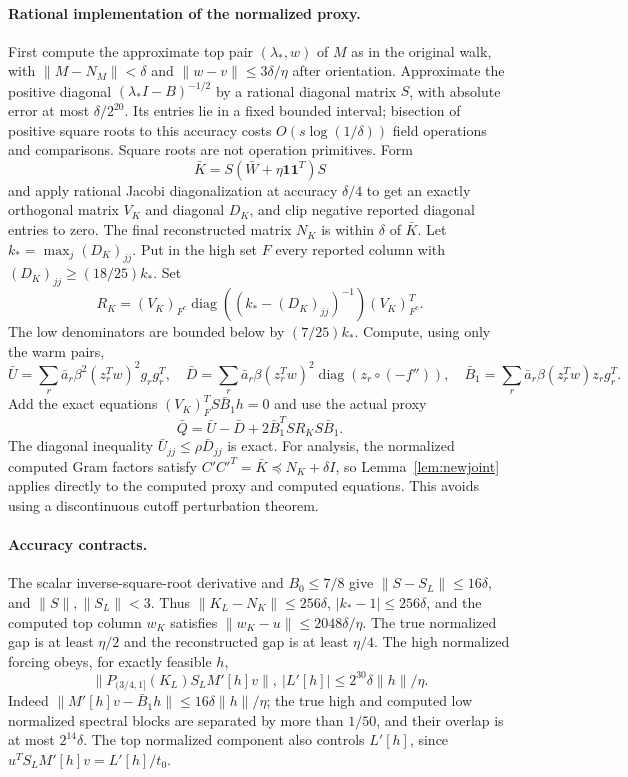 \documentclass[11pt]{amsart}
\theoremstyle{remark}\newtheorem{remark}[theorem]{Remark}
\newcommand{\one}{\mathbf1}
\begin{document}
\paragraph{Rational implementation of the normalized proxy.}
First compute the approximate top pair $(\lambda_*,w)$ of $M$ as in the
original walk, with $\|M-N_M\|<\delta$ and $\|w-v\|\le3\delta/\eta$
after orientation. Approximate the positive diagonal
$(\lambda_*I-B)^{-1/2}$ by a rational diagonal matrix $S$, with absolute
error at most $\delta/2^{20}$. Its entries lie in a fixed bounded interval;
bisection of positive square roots to this accuracy costs
$O(s\log(1/\delta))$ field operations and comparisons. Square roots are
not operation primitives. Form
\[
 \bar K=S(\bar W+\eta\one\one^T)S
\]
and apply rational Jacobi diagonalization at accuracy $\delta/4$ to get an exactly orthogonal
matrix $V_K$ and diagonal $D_K$, and clip negative reported diagonal entries to zero. The final reconstructed
matrix $N_K$ is within $\delta$ of $\bar K$.
Let $k_* =\max_j(D_K)_{jj}$. Put in the high set $F$ every reported column
with $(D_K)_{jj}\ge(18/25)k_*$. Set
\[
 R_K=(V_K)_{F^c}\operatorname{diag}((k_*-(D_K)_{jj})^{-1})(V_K)_{F^c}^T.
\]
The low denominators are bounded below by $(7/25)k_*$.
Compute, using only the warm pairs,
\[
 \bar U=\sum_r\bar a_r\beta^2(z_r^Tw)^2g_rg_r^T,\quad
 \bar D=\sum_r\bar a_r\beta(z_r^Tw)^2
                         \operatorname{diag}(z_r\circ(-f'')),
 \quad \bar B_1=\sum_r\bar a_r\beta(z_r^Tw)z_rg_r^T.
\]
Add the exact equations $(V_K)_F^T S\bar B_1h=0$ and use the actual proxy
\begin{equation}\label{eq:genproxy}
 \bar Q=\bar U-\bar D+2\bar B_1^T S R_K S\bar B_1.
\end{equation}
The diagonal inequality $\bar U_{jj}\le\rho\bar D_{jj}$ is exact.
For analysis, the normalized computed Gram factors satisfy
$C'C'^T=\bar K\preceq N_K+\delta I$, so Lemma~\ref{lem:newjoint}
applies directly to the computed proxy and computed equations.
This avoids using a discontinuous cutoff perturbation theorem.

\paragraph{Accuracy contracts.}
The scalar inverse-square-root derivative and $B_0\le7/8$ give
$\|S-S_L\|\le16\delta$, and $\|S\|,\|S_L\|<3$.
Thus $\|K_L-N_K\|\le256\delta$, $|k_*-1|\le256\delta$,
and the computed top column $w_K$ satisfies
$\|w_K-u\|\le2048\delta/\eta$.
The true normalized gap is at least $\eta/2$ and the reconstructed gap
is at least $\eta/4$.
The high normalized forcing obeys, for exactly feasible $h$,
\[
 \|P_{(3/4,1]}(K_L)S_LM'[h]v\|,
 \ |L'[h]|
 \le 2^{30}\delta\|h\|/\eta.
\]
Indeed $\|M'[h]v-\bar B_1h\|\le16\delta\|h\|/\eta$;
the true high and computed low normalized spectral blocks are separated
by more than $1/50$, and their overlap is at most $2^{14}\delta$.
The top normalized component also controls $L'[h]$, since
$u^TS_LM'[h]v=L'[h]/t_0$.
\end{document}
